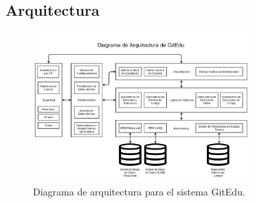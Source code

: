 \subsection{Arquitectura}

\begin{figure}
  \begin{center}
    \includegraphics[width=0.75\textwidth]{Figures/arq_ge.png}
  \end{center}
  \caption{Diagrama de arquitectura para el sistema GitEdu.}
  \label{arq_ge}
\end{figure}

